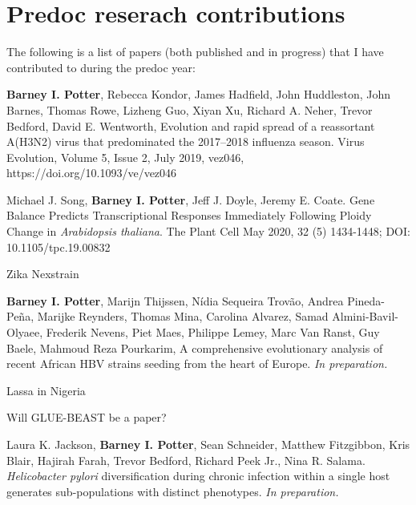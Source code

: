 \chapter{Predoc reserach contributions}\label{ch:myappendix}

The following is a list of papers (both published and in progress) that I have contributed to during the predoc year:

\textbf{Barney I. Potter}, Rebecca Kondor, James Hadfield, John Huddleston, John Barnes, Thomas Rowe, Lizheng Guo, Xiyan Xu, Richard A. Neher, Trevor Bedford, David E. Wentworth, Evolution and rapid spread of a reassortant A(H3N2) virus that predominated the 2017–2018 influenza season. Virus Evolution, Volume 5, Issue 2, July 2019, vez046, https://doi.org/10.1093/ve/vez046

Michael J. Song, \textbf{Barney I. Potter}, Jeff J. Doyle, Jeremy E. Coate. Gene Balance Predicts Transcriptional Responses Immediately Following Ploidy Change in \textit{Arabidopsis thaliana}. The Plant Cell May 2020, 32 (5) 1434-1448; DOI: 10.1105/tpc.19.00832

Zika Nexstrain

\textbf{Barney I. Potter}, Marijn Thijssen, N\'{i}dia Sequeira Trov\~{a}o,  Andrea Pineda-Pe\~{n}a, Marijke Reynders, Thomas Mina, Carolina Alvarez, Samad Almini-Bavil-Olyaee, Frederik Nevens, Piet Maes, Philippe Lemey, Marc Van Ranst, Guy Baele, Mahmoud Reza Pourkarim, A comprehensive evolutionary analysis of recent African HBV strains seeding from the heart of Europe. \textit{In preparation.}

Lassa in Nigeria

Will GLUE-BEAST be a paper?

Laura K. Jackson, \textbf{Barney I. Potter}, Sean Schneider, Matthew Fitzgibbon, Kris Blair, Hajirah Farah, Trevor Bedford, Richard Peek Jr., Nina R. Salama. \textit{Helicobacter pylori} diversification during chronic infection within a single host generates sub-populations with distinct phenotypes. \textit{In preparation.}


\cleardoublepage

